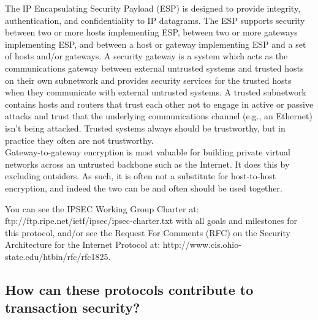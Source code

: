 \begin{htmllist}
    
    The IP Encapsulating Security Payload (ESP) is designed to provide
    integrity, authentication, and confidentiality to IP datagrams. The ESP
    supports security between two or more hosts implementing ESP, between
    two or more gateways implementing ESP, and between a host or gateway
    implementing ESP and a set of hosts and/or gateways. A security gateway
    is a system which acts as the communications gateway between external
    untrusted systems and trusted hosts on their own subnetwork and
    provides security services for the trusted hosts when they communicate
    with external untrusted systems. A trusted subnetwork contains hosts
    and routers that trust each other not to engage in active or passive
    attacks and trust that the underlying communications channel (e.g., an
    Ethernet) isn't being attacked. Trusted systems always should be
    trustworthy, but in practice they often are not trustworthy.\\
    
    Gateway-to-gateway encryption is most valuable for building private
    virtual networks across an untrusted backbone such as the Internet. It
    does this by excluding outsiders. As such, it is often not a substitute
    for host-to-host encryption, and indeed the two can be and often should
    be used together.\\

    
    You can see the IPSEC Working Group Charter at:
    {ftp://ftp.ripe.net/ietf/ipsec/ipsec-charter.txt}
    with all goals and milestones for this protocol, and/or see the Request
    For Comments (RFC) on the Security Architecture for the Internet
    Protocol at:
    {http://www.cis.ohio-state.edu/htbin/rfc/rfc1825}.
\end{htmllist}

\subsection{How can these protocols contribute to transaction security?}

